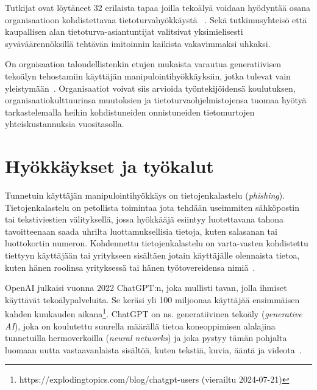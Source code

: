 \begin{otherlanguage}{finnish}
Tutkijat ovat löytäneet 32 erilaista tapaa joilla tekoälyä voidaan hyödyntää osana organisaatioon kohdistettavaa tietoturvahyökkäystä ~\citep{mirsky_Threat_Offensive_AI_Organizations_2023}. Sekä tutkimusyhteisö että kaupallisen alan tietoturva-asiantuntijat valitsivat yksimielisesti syväväärennöksillä tehtävän imitoinnin kaikista vakavimmaksi uhkaksi. 

On orgnisaation taloudellistenkin etujen mukaista varautua generatiivisen tekoälyn tehostamiin käyttäjän manipulointihyökkäyksiin, jotka tulevat vain yleistymään~\citep{blauth_AI_Crime_Overview_Malicious_Use_Abuse_2022}. Organisaatiot voivat siis arvioida työntekijöidensä koulutuksen, organisaatiokulttuurinsa muutoksien ja tietoturvaohjelmistojensa tuomaa hyötyä tarkastelemalla heihin kohdistuneiden onnistuneiden tietomurtojen yhteiskustannuksia vuositasolla.







\section*{Hyökkäykset ja työkalut}

Tunnetuin käyttäjän manipulointihyökkäys on tietojenkalastelu (\textit{phishing}). Tietojenkalastelu on petollista toimintaa jota tehdään useimmiten sähköpostin tai tekstiviestien välityksellä, jossa hyökkääjä esiintyy luotettavana tahona tavoitteenaan saada uhrilta luottamuksellisia tietoja, kuten salasanan tai luottokortin numeron. Kohdennettu tietojenkalastelu on varta-vasten kohdistettu tiettyyn käyttäjään tai yritykseen sisältäen jotain käyttäjälle olennaista tietoa, kuten hänen roolinsa yrityksessä tai hänen työtovereidensa nimiä~\citep{wang_Defining_Social_Engineering_2020}.

OpenAI julkaisi vuonna 2022 ChatGPT:n, joka mullisti tavan, jolla ihmiset käyttävät tekoälypalveluita. Se keräsi yli 100 miljoonaa käyttäjää ensimmäisen kahden kuukauden aikana\footnote{https://explodingtopics.com/blog/chatgpt-users (vierailtu 2024-07-21)}. ChatGPT on ns. generatiivinen tekoäly (\textit{generative AI}), joka on koulutettu suurella määrällä tietoa koneoppimisen alalajina tunnetuilla hermoverkoilla (\textit{neural networks}) ja joka pystyy tämän pohjalta luomaan uutta vastaavanlaista sisältöä, kuten tekstiä, kuvia, ääntä ja videota~\citep{fakhouri_AI_Driven_Solutions_SE_Attacks_2024}.


\end{otherlanguage}

